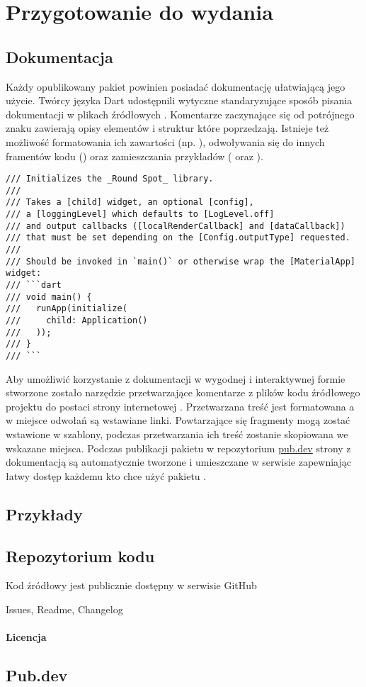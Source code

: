 \section{Przygotowanie do wydania}

\subsection{Dokumentacja}
Każdy opublikowany pakiet powinien posiadać dokumentację ułatwiającą jego użycie. Twórcy języka Dart udostępnili wytyczne standaryzujące sposób pisania dokumentacji w plikach źródłowych \cite{Dart_Doc_Guidelines}. Komentarze zaczynające się od potrójnego znaku \codeinline{///} zawierają opisy elementów i struktur które poprzedzają. Istnieje też możliwość formatowania ich zawartości (np. ), odwoływania się do innych framentów kodu () oraz zamieszczania przykładów ( oraz ).

\begin{lstlisting}[language=dartcomment,caption={Fragment dokumentacji zawartej w kodzie źródłowym pakietu},label=lst:rs_docs]
/// Initializes the _Round Spot_ library.
///
/// Takes a [child] widget, an optional [config],
/// a [loggingLevel] which defaults to [LogLevel.off]
/// and output callbacks ([localRenderCallback] and [dataCallback]) 
/// that must be set depending on the [Config.outputType] requested.
///
/// Should be invoked in `main()` or otherwise wrap the [MaterialApp] widget:
/// ```dart
/// void main() {
///   runApp(initialize(
///     child: Application()
///   ));
/// }
/// ```
\end{lstlisting}

Aby umożliwić korzystanie z dokumentacji w wygodnej i interaktywnej formie stworzone zostało narzędzie  przetwarzające komentarze z plików kodu źródłowego projektu do postaci strony internetowej \cite{Dart_Doc}. Przetwarzana treść jest formatowana a w miejsce odwołań są wstawiane linki. Powtarzające się fragmenty mogą zostać wstawione w szablony, podczas przetwarzania ich treść zostanie skopiowana we wskazane miejsca. Podczas publikacji pakietu w repozytorium \href{https://pub.dev/}{pub.dev} strony z dokumentacją są automatycznie tworzone i umieszczane w serwisie zapewniając łatwy dostęp każdemu kto chce użyć pakietu \cite{RS_Documentation}.


\subsection{Przykłady}

\subsection{Repozytorium kodu}
Kod źródłowy jest publicznie dostępny w serwisie GitHub \cite{RoundSpot_GitHub}

Issues, Readme, Changelog

\paragraph{Licencja}

\subsection{Pub.dev}
